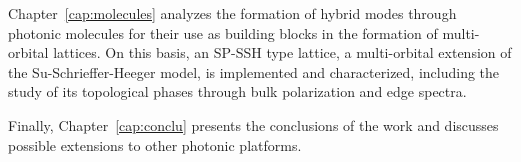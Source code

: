 Chapter~\ref{cap:molecules} analyzes the formation of hybrid modes through photonic molecules for their use as building blocks in the formation of multi-orbital lattices. On this basis, an SP-SSH type lattice, a multi-orbital extension of the Su-Schrieffer-Heeger model, is implemented and characterized, including the study of its topological phases through bulk polarization and edge spectra.

Finally, Chapter~\ref{cap:conclu} presents the conclusions of the work and discusses possible extensions to other photonic platforms.